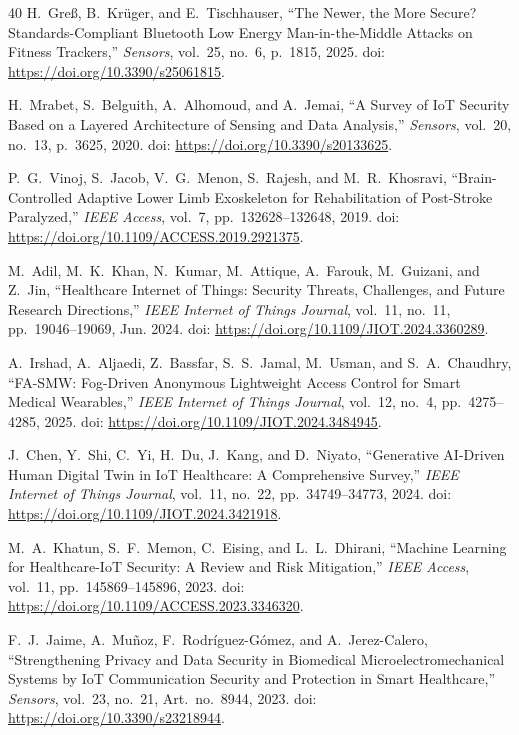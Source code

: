 \documentclass[journal]{IEEEtran}
\begin{document}
\begin{thebibliography}{40}
H.~Gre{\ss}, B.~Kr\"{u}ger, and E.~Tischhauser, ``The Newer, the More Secure? Standards-Compliant Bluetooth Low Energy Man-in-the-Middle Attacks on Fitness Trackers,'' \emph{Sensors}, vol.~25, no.~6, p.~1815, 2025. doi: \url{https://doi.org/10.3390/s25061815}.

H.~Mrabet, S.~Belguith, A.~Alhomoud, and A.~Jemai, ``A Survey of IoT Security Based on a Layered Architecture of Sensing and Data Analysis,'' \emph{Sensors}, vol.~20, no.~13, p.~3625, 2020. doi: \url{https://doi.org/10.3390/s20133625}.

P.~G.~Vinoj, S.~Jacob, V.~G.~Menon, S.~Rajesh, and M.~R.~Khosravi, ``Brain-Controlled Adaptive Lower Limb Exoskeleton for Rehabilitation of Post-Stroke Paralyzed,'' \emph{IEEE Access}, vol.~7, pp.~132628--132648, 2019. doi: \url{https://doi.org/10.1109/ACCESS.2019.2921375}.

M.~Adil, M.~K.~Khan, N.~Kumar, M.~Attique, A.~Farouk, M.~Guizani, and Z.~Jin, ``Healthcare Internet of Things: Security Threats, Challenges, and Future Research Directions,'' \emph{IEEE Internet of Things Journal}, vol.~11, no.~11, pp.~19046--19069, Jun. 2024. doi: \url{https://doi.org/10.1109/JIOT.2024.3360289}.

A.~Irshad, A.~Aljaedi, Z.~Bassfar, S.~S.~Jamal, M.~Usman, and S.~A.~Chaudhry, ``FA-SMW: Fog-Driven Anonymous Lightweight Access Control for Smart Medical Wearables,'' \emph{IEEE Internet of Things Journal}, vol.~12, no.~4, pp.~4275--4285, 2025. doi: \url{https://doi.org/10.1109/JIOT.2024.3484945}.

J.~Chen, Y.~Shi, C.~Yi, H.~Du, J.~Kang, and D.~Niyato, ``Generative AI-Driven Human Digital Twin in IoT Healthcare: A Comprehensive Survey,'' \emph{IEEE Internet of Things Journal}, vol.~11, no.~22, pp.~34749--34773, 2024. doi: \url{https://doi.org/10.1109/JIOT.2024.3421918}.

M.~A.~Khatun, S.~F.~Memon, C.~Eising, and L.~L.~Dhirani, ``Machine Learning for Healthcare-IoT Security: A Review and Risk Mitigation,'' \emph{IEEE Access}, vol.~11, pp.~145869--145896, 2023. doi: \url{https://doi.org/10.1109/ACCESS.2023.3346320}.

F.~J.~Jaime, A.~Mu{\~n}oz, F.~Rodr{\'i}guez-G{\'o}mez, and A.~Jerez-Calero, ``Strengthening Privacy and Data Security in Biomedical Microelectromechanical Systems by IoT Communication Security and Protection in Smart Healthcare,'' \emph{Sensors}, vol.~23, no.~21, Art.~no.~8944, 2023. doi: \url{https://doi.org/10.3390/s23218944}.


\end{thebibliography}
\end{document}
